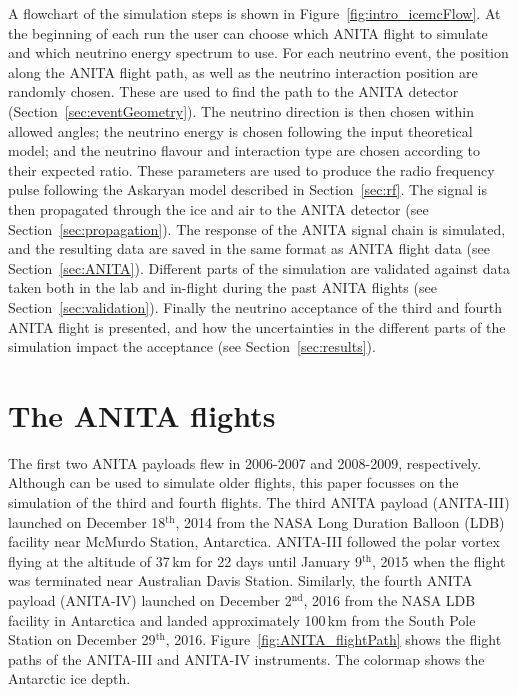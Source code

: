 A flowchart of the \icemc simulation steps is shown in Figure~\ref{fig:intro_icemcFlow}.
At the beginning of each run the user can choose which ANITA flight to simulate and which neutrino energy spectrum to use.
For each neutrino event, the position along the ANITA flight path, as well as the neutrino interaction position are randomly chosen.
These are used to find the path to the ANITA detector (Section~\ref{sec:eventGeometry}).%
The neutrino direction is then chosen within allowed angles; the neutrino energy is chosen following the input theoretical model; and the neutrino flavour and interaction type are chosen according to their expected ratio. 
These parameters are used to produce the radio frequency pulse following the Askaryan model described in Section~\ref{sec:rf}.
The signal is then propagated through the ice and air to the ANITA
detector (see Section~\ref{sec:propagation}). 
The response of the ANITA signal chain is simulated, and the resulting 
data are saved in the same format as ANITA flight data 
(see Section~\ref{sec:ANITA}).
Different parts of the simulation are validated against data taken both in
the lab and in-flight during the past ANITA flights (see
Section~\ref{sec:validation}).
Finally the neutrino acceptance of the third and fourth ANITA flight is
presented, and how the uncertainties in the different parts of the
simulation impact the acceptance (see Section~\ref{sec:results}).




\section{The ANITA flights}
\label{sec:anita3}
The first two ANITA payloads flew in 2006-2007\cite{ANITA1paper} and 2008-2009\cite{ANITA2paper,ANITA2erratum}, respectively.
Although \icemc can be used to simulate older flights, this paper focusses on the simulation of the third and fourth flights.
The third ANITA payload (ANITA-III) launched on December 18$^{\text{th}}$, 2014 from the
NASA Long Duration Balloon (LDB) facility near McMurdo Station, Antarctica.
ANITA-III followed the polar vortex flying at the altitude of 37\,km for
22 days until January 9$^{\text{th}}$, 2015 when the flight was terminated
near Australian Davis Station.
Similarly, the fourth ANITA payload (ANITA-IV) launched on December 2$^{\text{nd}}$, 2016 from the NASA LDB facility in Antarctica and landed approximately 100\,km from the South Pole Station on December 29$^{\text{th}}$, 2016.
Figure~\ref{fig:ANITA_flightPath} shows the flight paths of the ANITA-III and ANITA-IV instruments. 
The colormap shows the Antarctic ice depth.

